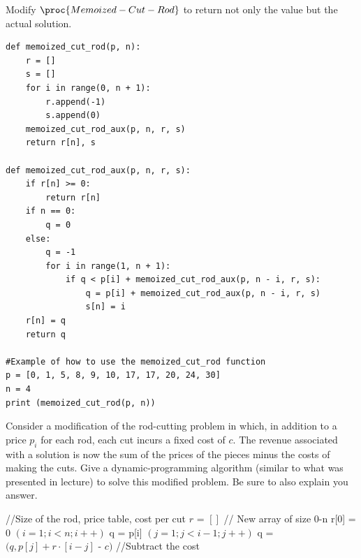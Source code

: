 \documentclass[addpoints,11pt]{exam}
\begin{document}
\begin{questions}


\question[5]
Modify $\proc{Memoized-Cut-Rod}$ to return not only the value but the actual solution.

\begin{solutionorbox}
\begin{verbatim}
def memoized_cut_rod(p, n):
    r = []
    s = []
    for i in range(0, n + 1):
        r.append(-1)
        s.append(0)
    memoized_cut_rod_aux(p, n, r, s)
    return r[n], s

def memoized_cut_rod_aux(p, n, r, s):
    if r[n] >= 0:
        return r[n]
    if n == 0:
        q = 0
    else:
        q = -1
        for i in range(1, n + 1):
            if q < p[i] + memoized_cut_rod_aux(p, n - i, r, s):
                q = p[i] + memoized_cut_rod_aux(p, n - i, r, s)
                s[n] = i
    r[n] = q
    return q

#Example of how to use the memoized_cut_rod function
p = [0, 1, 5, 8, 9, 10, 17, 17, 20, 24, 30]
n = 4
print (memoized_cut_rod(p, n))

\end{verbatim}
\end{solutionorbox}

\ifprintanswers
\newpage
\else
\bigskip
\fi


\question[5]
Consider a modification of the rod-cutting problem in which, in addition to a price $p_i$ for each rod, each cut incurs a fixed cost of $c$.  The revenue associated with a solution is now the sum of the prices of the pieces minus the costs of making the cuts.  Give a dynamic-programming algorithm (similar to what was presented in lecture) to solve this modified problem.  Be sure to also explain you answer.

\begin{solutionorbox}
\begin{codebox}
    \li //Size of the rod, price table, cost per cut
        \li $r$ = $[]$ // New array of size 0-n
        \li r[0] = 0
        \li \For $(i = 1; i < n; i++)$ \Do
	\li q = p[i]
        \li \For $(j = 1; j < i-1; j++)$ \Do
        \li q =  $( q , p [ j ] + r \cdot [ i - j  ]$ - $ c )$ //Subtract the cost


\end{codebox}
\end{solutionorbox}
\end{questions}
\end{document}
